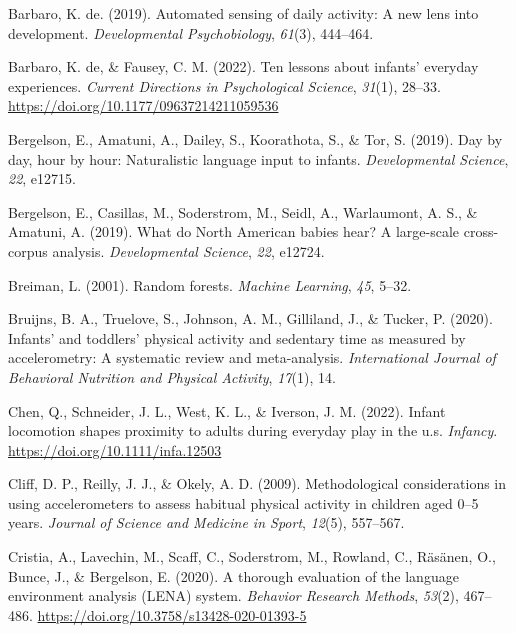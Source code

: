 \documentclass[
  man]{apa6}
\newlength{\cslhangindent}
\newlength{\cslentryspacingunit} %
\newenvironment{CSLReferences}[2] %
 {%
  \setlength{\parindent}{0pt}
  \ifodd #1
  \let\oldpar\par
  \def\par{\hangindent=\cslhangindent\oldpar}
  \fi
  \setlength{\parskip}{#2\cslentryspacingunit}
 }%
 {}
\begin{document}
\begin{CSLReferences}{1}{0}
\leavevmode{}%
Barbaro, K. de. (2019). Automated sensing of daily activity: A new lens into development. \emph{Developmental Psychobiology}, \emph{61}(3), 444--464.

\leavevmode{}%
Barbaro, K. de, \& Fausey, C. M. (2022). Ten lessons about infants' everyday experiences. \emph{Current Directions in Psychological Science}, \emph{31}(1), 28--33. \url{https://doi.org/10.1177/09637214211059536}

\leavevmode{}%
Bergelson, E., Amatuni, A., Dailey, S., Koorathota, S., \& Tor, S. (2019). Day by day, hour by hour: Naturalistic language input to infants. \emph{Developmental Science}, \emph{22}, e12715.

\leavevmode{}%
Bergelson, E., Casillas, M., Soderstrom, M., Seidl, A., Warlaumont, A. S., \& Amatuni, A. (2019). What do {N}orth {A}merican babies hear? {A} large-scale cross-corpus analysis. \emph{Developmental Science}, \emph{22}, e12724.

\leavevmode{}%
Breiman, L. (2001). Random forests. \emph{Machine Learning}, \emph{45}, 5--32.

\leavevmode{}%
Bruijns, B. A., Truelove, S., Johnson, A. M., Gilliland, J., \& Tucker, P. (2020). Infants' and toddlers' physical activity and sedentary time as measured by accelerometry: A systematic review and meta-analysis. \emph{International Journal of Behavioral Nutrition and Physical Activity}, \emph{17}(1), 14.

\leavevmode{}%
Chen, Q., Schneider, J. L., West, K. L., \& Iverson, J. M. (2022). Infant locomotion shapes proximity to adults during everyday play in the u.s. \emph{Infancy}. \url{https://doi.org/10.1111/infa.12503}

\leavevmode{}%
Cliff, D. P., Reilly, J. J., \& Okely, A. D. (2009). Methodological considerations in using accelerometers to assess habitual physical activity in children aged 0--5 years. \emph{Journal of Science and Medicine in Sport}, \emph{12}(5), 557--567.

\leavevmode{}%
Cristia, A., Lavechin, M., Scaff, C., Soderstrom, M., Rowland, C., Räsänen, O., Bunce, J., \& Bergelson, E. (2020). A thorough evaluation of the language environment analysis ({LENA}) system. \emph{Behavior Research Methods}, \emph{53}(2), 467--486. \url{https://doi.org/10.3758/s13428-020-01393-5}


\end{CSLReferences}
\end{document}
